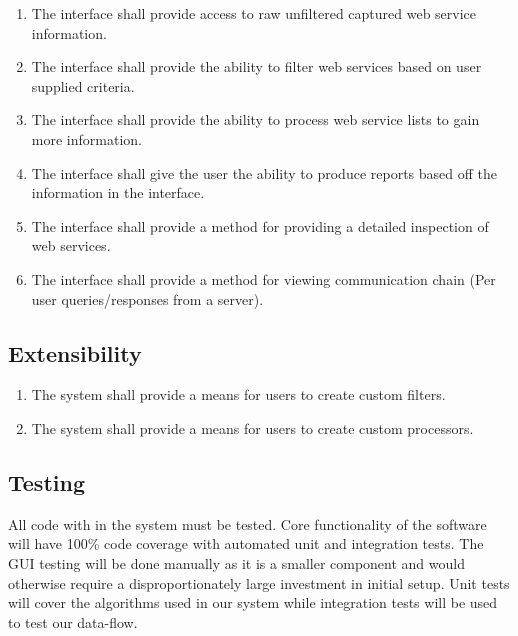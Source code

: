 \documentclass[titlepage]{article}
\begin{document}
\begin{enumerate}
    \item The interface shall provide access to raw unfiltered captured
        web service information.
    \item The interface shall provide the ability to filter web
        services based on user supplied criteria.
    \item The interface shall provide the ability to process web
        service lists to gain more information.
    \item The interface shall give the user the ability to produce
        reports based off the information in the interface.
    \item The interface shall provide a method for providing a
        detailed inspection of web services.
    \item The interface shall provide a method for viewing
        communication chain (Per user queries/responses from a server).
\end{enumerate}

%


\subsection{Extensibility%
  \label{extensibility}%
}
\begin{enumerate}
    \item The system shall provide a means for users to create custom filters.
    \item The system shall provide a means for users to create custom processors.
\end{enumerate}

\subsection{Testing%
    \label{testing}%
}
All code with in the system must be tested. Core functionality of the software
will have 100\% code coverage with automated unit and integration tests.  The
GUI testing will be done manually as it is a smaller component and would
otherwise require a disproportionately large investment in initial setup.  Unit
tests will cover the algorithms used in our system while integration tests will
be used to test our data-flow.  
\end{document}
